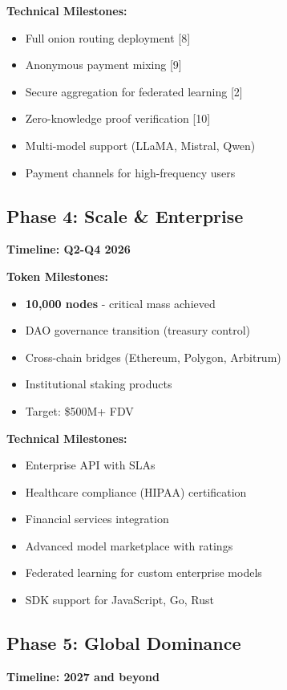 \documentclass[11pt,a4paper]{article}
\begin{document}
\textbf{Technical Milestones:}
\begin{itemize}
    \item Full onion routing deployment [8]
    \item Anonymous payment mixing [9]
    \item Secure aggregation for federated learning [2]
    \item Zero-knowledge proof verification [10]
    \item Multi-model support (LLaMA, Mistral, Qwen)
    \item Payment channels for high-frequency users
\end{itemize}

\subsection{Phase 4: Scale \& Enterprise}

\textbf{Timeline: Q2-Q4 2026}

\textbf{Token Milestones:}
\begin{itemize}
    \item \textbf{10,000 nodes} - critical mass achieved
    \item DAO governance transition (treasury control)
    \item Cross-chain bridges (Ethereum, Polygon, Arbitrum)
    \item Institutional staking products
    \item Target: \$500M+ FDV
\end{itemize}

\textbf{Technical Milestones:}
\begin{itemize}
    \item Enterprise API with SLAs
    \item Healthcare compliance (HIPAA) certification
    \item Financial services integration
    \item Advanced model marketplace with ratings
    \item Federated learning for custom enterprise models
    \item SDK support for JavaScript, Go, Rust
\end{itemize}

\subsection{Phase 5: Global Dominance}

\textbf{Timeline: 2027 and beyond}
\end{document}
